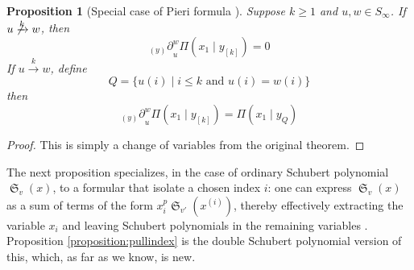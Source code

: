 \documentclass{amsart}
\newtheorem{proposition}[lemma]{Proposition}
\theoremstyle{definition}
\theoremstyle{remark}
\numberwithin{equation}{subsection}
\DeclareMathOperator{\sch}{\mathfrak{S}}
\newcommand{\tom}[1]{\xrightarrow{#1}}
\newcommand{\smpfu}{\mathsf{\Pi}}
\newcommand{\smpr}[3]{\ensuremath{}\smpfu\left( #1 \mid #2_{[#3]}\right)}
\newcommand{\smpre}[2]{\ensuremath{}\smpfu\left( #1 \mid #2\right)}
\newcommand{\ddv}[1]{{{}_{{\scriptscriptstyle (#1)}}\partial}}
\begin{document}
	\begin{proposition}[Special case of Pieri formula {\cite[Theorem~7.1]{samuelmolev}}] \label{proposition:pieri}
Suppose $k\geq 1$ and $u,w\in S_\infty$. If $u\not\tom{k} w$, then
$$\ddv{y}_u^w\smpr{x_1}{y}{k}=0$$
If $u\tom{k} w$, define
$$Q = \{u(i)\mid i\leq k\mbox{ and }u(i)=w(i)\}$$
then
$$\ddv{y}_u^w\smpr{x_1}{y}{k}=\smpre{x_1}{y_Q}$$
\end{proposition}
\begin{proof}
	This is simply a change of variables from the original theorem.
\end{proof}

The next proposition specializes, in the case of ordinary Schubert polynomial $\sch_v(x)$, to a formular that isolate a chosen index $i$: one can express $\sch_v(x)$ as a sum of terms of the form $x_i^p\sch_{v'}(x^{(i)})$, thereby effectively extracting the variable $x_i$ and leaving Schubert polynomials in the remaining variables \cite[Theorem~5.1]{bsskew}. Proposition \ref{proposition:pullindex} is the double Schubert polynomial version of this, which, as far as we know, is new.%
\end{document}
